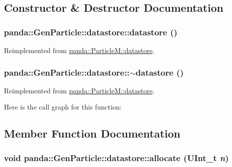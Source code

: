 \subsection{Constructor \& Destructor Documentation}
\hypertarget{structpanda_1_1GenParticle_1_1datastore_ad1aab7880b9699f04e712abc69799953}{
\subsubsection[{datastore}]{\setlength{\rightskip}{0pt plus 5cm}panda::GenParticle::datastore::datastore ()}}
\label{structpanda_1_1GenParticle_1_1datastore_ad1aab7880b9699f04e712abc69799953}


Reimplemented from \hyperlink{structpanda_1_1ParticleM_1_1datastore_acc9af307e2c4fee9bc5d9bbb37ad6124}{panda::ParticleM::datastore}.\hypertarget{structpanda_1_1GenParticle_1_1datastore_af04b1b2c05d433c8020d5250db10d7d9}{
\subsubsection[{$\sim$datastore}]{\setlength{\rightskip}{0pt plus 5cm}panda::GenParticle::datastore::$\sim$datastore ()}}
\label{structpanda_1_1GenParticle_1_1datastore_af04b1b2c05d433c8020d5250db10d7d9}


Reimplemented from \hyperlink{structpanda_1_1ParticleM_1_1datastore_ae068980c20730bc8565d2f7ea701bc5e}{panda::ParticleM::datastore}.

Here is the call graph for this function:

\subsection{Member Function Documentation}
\hypertarget{structpanda_1_1GenParticle_1_1datastore_a431a6d40dc4affce7107d9368d2932a9}{
\subsubsection[{allocate}]{\setlength{\rightskip}{0pt plus 5cm}void panda::GenParticle::datastore::allocate (UInt\_\-t {\em n})}}
\label{structpanda_1_1GenParticle_1_1datastore_a431a6d40dc4affce7107d9368d2932a9}


